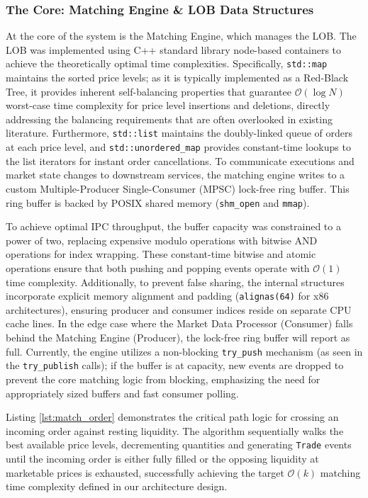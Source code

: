 \documentclass[12pt,a4paper]{article}
\begin{document}
\subsubsection{The Core: Matching Engine \& LOB Data Structures}
At the core of the system is the Matching Engine, which manages the LOB. The LOB was implemented using C++ standard library node-based containers to achieve the theoretically optimal time complexities. Specifically, \texttt{std::map} maintains the sorted price levels; as it is typically implemented as a Red-Black Tree, it provides inherent self-balancing properties that guarantee $\mathcal{O}(\log N)$ worst-case time complexity for price level insertions and deletions, directly addressing the balancing requirements that are often overlooked in existing literature. Furthermore, \texttt{std::list} maintains the doubly-linked queue of orders at each price level, and \texttt{std::unordered\_map} provides constant-time lookups to the list iterators for instant order cancellations. To communicate executions and market state changes to downstream services, the matching engine writes to a custom Multiple-Producer Single-Consumer (MPSC) lock-free ring buffer. This ring buffer is backed by POSIX shared memory (\texttt{shm\_open} and \texttt{mmap}).

To achieve optimal IPC throughput, the buffer capacity was constrained to a power of two, replacing expensive modulo operations with bitwise AND operations for index wrapping. These constant-time bitwise and atomic operations ensure that both pushing and popping events operate with $\mathcal{O}(1)$ time complexity. Additionally, to prevent false sharing, the internal structures incorporate explicit memory alignment and padding (\texttt{alignas(64)} for x86 architectures), ensuring producer and consumer indices reside on separate CPU cache lines. In the edge case where the Market Data Processor (Consumer) falls behind the Matching Engine (Producer), the lock-free ring buffer will report as full. Currently, the engine utilizes a non-blocking \texttt{try\_push} mechanism (as seen in the \texttt{try\_publish} calls); if the buffer is at capacity, new events are dropped to prevent the core matching logic from blocking, emphasizing the need for appropriately sized buffers and fast consumer polling.

Listing \ref{lst:match_order} demonstrates the critical path logic for crossing an incoming order against resting liquidity. The algorithm sequentially walks the best available price levels, decrementing quantities and generating \texttt{Trade} events until the incoming order is either fully filled or the opposing liquidity at marketable prices is exhausted, successfully achieving the target $\mathcal{O}(k)$ matching time complexity defined in our architecture design.
\end{document}
